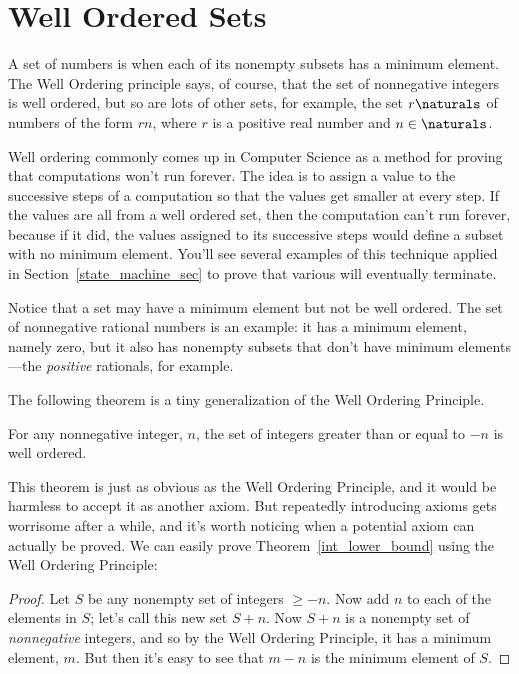 \section{Well Ordered Sets}\label{well_ordering_sec}

A set of numbers is  when each of its nonempty
subsets has a minimum element.  The Well Ordering principle says, of
course, that the set of nonnegative integers is well ordered, but so
are lots of other sets, for example, the set $r\naturals$ of numbers
of the form $rn$, where $r$ is a positive real number and $n \in
\naturals$.

Well ordering commonly comes up in Computer Science as a method for
proving that computations won't run forever.  The idea is to assign a
value to the successive steps of a computation so that the values get
smaller at every step.  If the values are all from a well ordered set,
then the computation can't run forever, because if it did, the values
assigned to its successive steps would define a subset with no minimum
element.  You'll see several examples of this technique applied in
Section~\ref{state_machine_sec} to prove that various  will eventually terminate.

Notice that a set may have a minimum element but not be well ordered.
The set of nonnegative rational numbers is an example: it has a
minimum element, namely zero, but it also has nonempty subsets that
don't have minimum elements ---the \emph{positive} rationals, for
example.

The following theorem is a tiny generalization of the Well Ordering
Principle.

\begin{theorem}\label{int_lower_bound}
For any nonnegative integer, $n$, the set of integers greater than or equal to $-n$
is well ordered.
\end{theorem}

This theorem is just as obvious as the Well Ordering Principle, and it
would be harmless to accept it as another axiom.  But repeatedly
introducing axioms gets worrisome after a while, and it's worth
noticing when a potential axiom can actually be proved.  We can easily
prove Theorem~\ref{int_lower_bound} using the Well Ordering Principle:

\begin{proof}
Let $S$ be any nonempty set of integers $\geq -n$.  Now add $n$ to
each of the elements in $S$; let's call this new set $S+n$.  Now $S+n$
is a nonempty set of \emph{nonnegative} integers, and so by the Well
Ordering Principle, it has a minimum element, $m$.  But then it's easy
to see that $m - n$ is the minimum element of $S$.
\end{proof}

